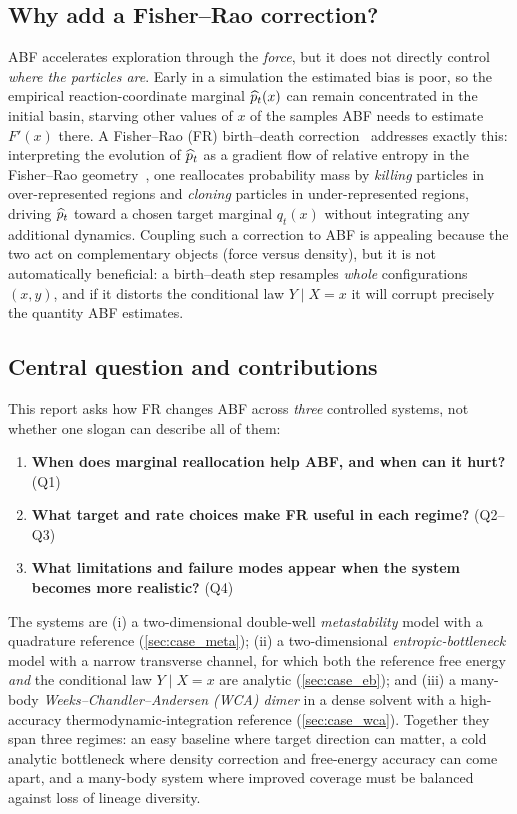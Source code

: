\subsection{Why add a Fisher--Rao correction?}
ABF accelerates exploration through the \emph{force}, but it does not directly
control \emph{where the particles are}. Early in a simulation the estimated bias
is poor, so the empirical reaction-coordinate marginal $\widehat{p}_t(x)$ can remain
concentrated in the initial basin, starving other values of $x$ of the samples
ABF needs to estimate $F'(x)$ there. A Fisher--Rao (FR) birth--death
correction~\citep{LuLuNolen2019} addresses exactly this: interpreting the
evolution of $\widehat{p}_t$ as a gradient flow of relative entropy in the
Fisher--Rao geometry~\citep{Amari2016}, one reallocates probability mass by
\emph{killing} particles in over-represented regions and \emph{cloning}
particles in under-represented regions, driving $\widehat{p}_t$ toward a chosen target
marginal $q_t(x)$ without integrating any additional dynamics. Coupling such a
correction to ABF is appealing because the two act on complementary objects
(force versus density), but it is not automatically beneficial: a birth--death
step resamples \emph{whole} configurations $(x,y)$, and if it distorts the
conditional law $Y\mid X=x$ it will corrupt precisely the quantity ABF estimates.

\subsection{Central question and contributions}
This report asks how FR changes ABF across \emph{three} controlled systems, not
whether one slogan can describe all of them:
\begin{enumerate}
  \item \textbf{When does marginal reallocation help ABF, and when can it hurt?}
        (Q1)
  \item \textbf{What target and rate choices make FR useful in each regime?}
        (Q2--Q3)
  \item \textbf{What limitations and failure modes appear when the system becomes
        more realistic?} (Q4)
\end{enumerate}
The systems are (i) a two-dimensional double-well \emph{metastability} model
with a quadrature reference (\cref{sec:case_meta}); (ii) a two-dimensional
\emph{entropic-bottleneck} model with a narrow transverse channel, for which both
the reference free energy \emph{and} the conditional law $Y\mid X=x$ are analytic
(\cref{sec:case_eb}); and (iii) a many-body \emph{Weeks--Chandler--Andersen
(WCA) dimer} in a dense solvent with a high-accuracy thermodynamic-integration
reference (\cref{sec:case_wca}). Together they span three regimes: an easy
baseline where target direction can matter, a cold analytic bottleneck where
density correction and free-energy accuracy can come apart, and a many-body
system where improved coverage must be balanced against loss of lineage diversity.

